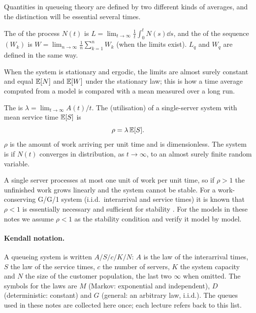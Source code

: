 Quantities in queueing theory are defined by two different kinds of averages, and the
distinction will be essential several times.

\begin{definition}\label{L1:def:averages}
The  of the process $N(t)$ is
$L=\lim_{t\to\infty}\frac1t\int_0^t N(s)\dd s$, and the  of the
sequence $(W_k)$ is $W=\lim_{n\to\infty}\frac1n\sum_{k=1}^n W_k$ (when the limits
exist). $L_q$ and $W_q$ are defined in the same way.
\end{definition}

When the system is stationary and ergodic, the limits are almost surely constant and
equal $\mathbb{E}[N]$ and $\mathbb{E}[W]$ under the stationary law; this is how a time average computed
from a model is compared with a mean measured over a long run.

\begin{definition}\label{def:load}
The  is $\lambda=\lim_{t\to\infty}A(t)/t$.
The  (utilisation) of a single-server system with mean service time
$\mathbb{E}[S]$ is
\[
  \rho=\lambda\,\mathbb{E}[S].
\]
$\rho$ is the amount of work arriving per unit time and is dimensionless.
The system is  if $N(t)$ converges in distribution, as $t\to\infty$, to an
almost surely finite random variable.
\end{definition}

A single server processes at most one unit of work per unit time, so if $\rho>1$ the
unfinished work grows linearly and the system cannot be stable. For a work-conserving
G/G/1 system (i.i.d.\ interarrival and service times) it is known that $\rho<1$ is
essentially necessary and sufficient for stability \cite{loynes1962}. For the models
in these notes we assume $\rho<1$ as the stability condition and verify it model by
model.

\paragraph{Kendall notation.} A queueing system is written $A/S/c/K/N$: $A$ is the law
of the interarrival times, $S$ the law of the service times, $c$ the number of servers,
$K$ the system capacity and $N$ the size of the customer population, the last two
$\infty$ when omitted. The symbols for the laws are $M$ (Markov: exponential and
independent), $D$ (deterministic: constant) and $G$ (general: an arbitrary law, i.i.d.).
The queues used in these notes are collected here once; each lecture refers back to
this list.

